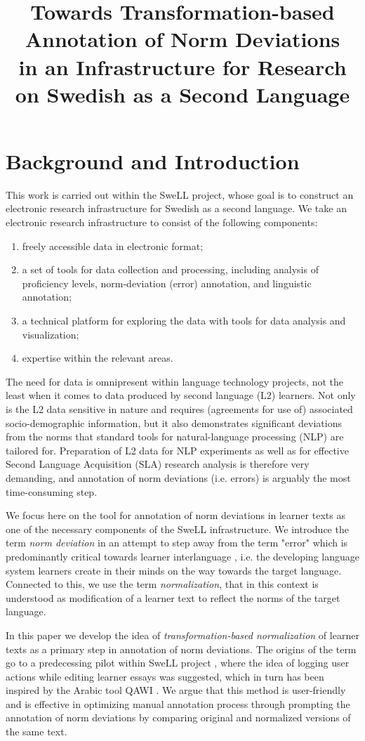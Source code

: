 \documentclass[10pt, a4paper]{article}
\title{Towards Transformation-based Annotation of Norm Deviations \\ in an Infrastructure for Research on Swedish as a Second Language}
\newcommand{\elena}[1]{{\color{BrickRed}{Elena: #1}}}
\begin{document}
\maketitleabstract

\section{Background and Introduction}

This work is carried out within the SweLL project, whose goal is to construct an electronic research infrastructure for Swedish as a second language. We take an electronic research infrastructure to consist of the following components: \elena{maybe we can shorten this list?}
\begin{enumerate}
\item freely accessible data in electronic format;
\item a set of tools for data collection and processing, including 
analysis of proficiency levels, norm-deviation (error) annotation, and linguistic annotation;
\item a technical platform for exploring the data with tools for data analysis and visualization;
\item expertise within the relevant areas.
\end{enumerate}

The need for data is omnipresent within language technology projects, not the least when it comes to data produced by second language (L2) learners. Not only is the L2 data sensitive in nature and requires (agreements for use of) associated socio-demographic information, but it also demonstrates significant deviations from the norms that standard tools for natural-language processing (NLP) are tailored for. Preparation of L2 data for NLP experiments as well as for effective Second Language Acquisition (SLA) research analysis is therefore very demanding, and annotation of norm deviations (i.e. errors) is arguably the most time-consuming step.

We focus here on the tool for annotation of norm deviations in learner texts as one of the necessary components of the SweLL infrastructure. We introduce the term \textit{norm deviation} in an attempt to step away from the term "error" which is predominantly critical towards learner interlanguage \cite{Selinker1972}, i.e. the developing language system learners create in their minds on the way towards the target language. Connected to this, we use the term \textit{normalization}, that in this context is understood as modification of a learner text to reflect the norms of the target language. 

In this paper we develop the idea of \textit{transformation-based normalization} of learner texts as a primary step in annotation of norm deviations. The origins of the term go to a predecessing pilot within SweLL project \cite{correctAnnotator}, where the idea of logging user actions while editing learner essays was suggested, which in turn has been inspired by the Arabic tool QAWI \cite{QAWI}. We argue that this method is user-friendly and is effective in optimizing manual annotation process through prompting the annotation of norm deviations by comparing original and normalized versions of the same text.
\end{document}
